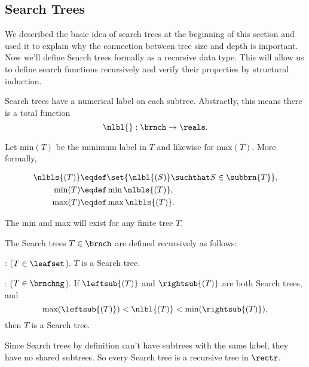 \begin{definition}
\subsection{Search Trees}
We described the basic idea of search trees at the beginning of this
section and used it to explain why the connection between tree size
and depth is important.  Now we'll define Search trees formally as a
recursive data type.  This will allow us to define search functions
recursively and verify their properties by structural induction.

Search trees have a numerical label on each subtree.  Abstractly, this
means there is a total function
\[
\nlbl{}:\brnch \to \reals.
\]

Let $\text{min}(T)$ be the minimum label in $T$ and likewise for
$\text{max}(T)$.  More formally,
\begin{definition}
\begin{align}
\nlbls{(T)} & \eqdef \set{\nlbl{(S)} \suchthat S \in \subbrn{T}},\\
\text{min}(T) &\eqdef \min \nlbls{(T)}, \label{defminT}\\
\text{max}(T) &\eqdef \max \nlbls{(T)}.\label{defmaxT}
\end{align}
\end{definition}
The min and max will exist for any finite tree $T$.

\begin{definition}\label{defsearchtree}
The Search trees $T \in \brnch$ are defined recursively as follows:

: ($T \in \leafset$).  $T$ is a Search tree.

: ($T \in \brnchng$).
If $\leftsub{(T)}$ and $\rightsub{(T)}$ are both Search trees, and
\[
\text{max}(\leftsub{(T)}) < \nlbl{(T)} < \text{min}(\rightsub{(T)}),
\]
then $T$ is a Search tree.
\end{definition}

Since Search trees by definition can't have subtrees with the same
label, they have no shared subtrees.  So every Search tree is a
recursive tree in $\rectr$.

\iffalse
\begin{definition}\label{defsearchtree}
A recursive tree $T \in \rectr$ is a \term{Search tree} when
\begin{equation}\label{}
\text{max}(\leftsub{(S)}) < \nlbl{(S)} < \text{min}(\rightsub{(S)}).
\end{equation}
for every nonleaf $S \in \subbrn{T}$.
\end{definition}
\fi


\end{definition}
